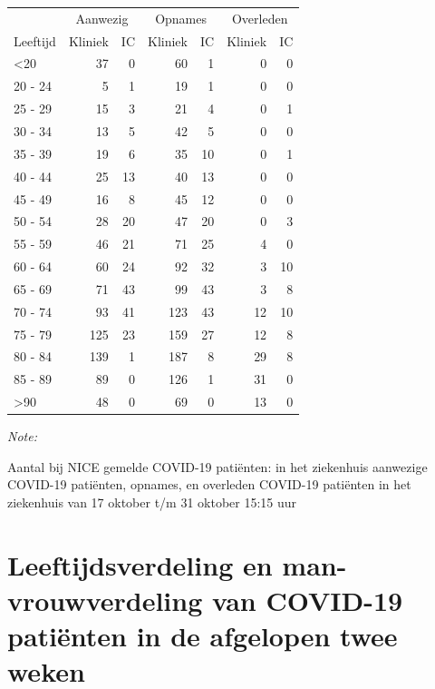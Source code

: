 \documentclass[
  english,
  man,floatsintext]{apa6}
\begin{document}
\begin{table}
\centering\begingroup\fontsize{10}{12}\selectfont

\begin{threeparttable}
\begin{tabular}{lrrrrrr}
\toprule
\multicolumn{1}{c}{ } & \multicolumn{2}{c}{Aanwezig} & \multicolumn{2}{c}{Opnames} & \multicolumn{2}{c}{Overleden} \\
\cmidrule(l{3pt}r{3pt}){2-3} \cmidrule(l{3pt}r{3pt}){4-5} \cmidrule(l{3pt}r{3pt}){6-7}
Leeftijd & Kliniek & IC & Kliniek & IC & Kliniek & IC\\
\midrule
<20 & 37 & 0 & 60 & 1 & 0 & 0\\
20 - 24 & 5 & 1 & 19 & 1 & 0 & 0\\
25 - 29 & 15 & 3 & 21 & 4 & 0 & 1\\
30 - 34 & 13 & 5 & 42 & 5 & 0 & 0\\
35 - 39 & 19 & 6 & 35 & 10 & 0 & 1\\
40 - 44 & 25 & 13 & 40 & 13 & 0 & 0\\
45 - 49 & 16 & 8 & 45 & 12 & 0 & 0\\
50 - 54 & 28 & 20 & 47 & 20 & 0 & 3\\
55 - 59 & 46 & 21 & 71 & 25 & 4 & 0\\
60 - 64 & 60 & 24 & 92 & 32 & 3 & 10\\
65 - 69 & 71 & 43 & 99 & 43 & 3 & 8\\
70 - 74 & 93 & 41 & 123 & 43 & 12 & 10\\
75 - 79 & 125 & 23 & 159 & 27 & 12 & 8\\
80 - 84 & 139 & 1 & 187 & 8 & 29 & 8\\
85 - 89 & 89 & 0 & 126 & 1 & 31 & 0\\
>90 & 48 & 0 & 69 & 0 & 13 & 0\\
\bottomrule
\end{tabular}
\begin{tablenotes}
\item \textit{Note: } 
\item Aantal bij NICE gemelde COVID-19 patiënten: in het ziekenhuis aanwezige COVID-19 patiënten, opnames, en overleden COVID-19 patiënten in het ziekenhuis van 17 oktober t/m 31 oktober 15:15 uur
\end{tablenotes}
\end{threeparttable}
\endgroup{}
\end{table}

\newpage

\hypertarget{leeftijdsverdeling-en-man-vrouwverdeling-van-covid-19-patiuxebnten-in-de-afgelopen-twee-weken}{%
\section{Leeftijdsverdeling en man-vrouwverdeling van COVID-19 patiënten in de afgelopen twee weken}\label{leeftijdsverdeling-en-man-vrouwverdeling-van-covid-19-patiuxebnten-in-de-afgelopen-twee-weken}}
\end{document}

